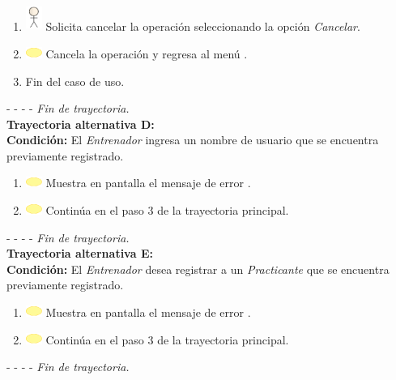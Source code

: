 \begin{enumerate}
	\item \includegraphics[width=15pt, height=25pt]{./Figuras/iconosCU/usuario.png} Solicita cancelar la operación seleccionando la opción \textit{Cancelar}.
	\item \includegraphics[width=15pt]{./Figuras/iconosCU/herramienta.png} Cancela la operación y regresa al menú .
	\item Fin del caso de uso.
\end{enumerate}

- - - - \textit{Fin de trayectoria.} \\



\textbf{\large{Trayectoria alternativa D:}}\\
\textbf{Condición: } El \textit{Entrenador} ingresa un nombre de usuario que se encuentra previamente registrado.

\begin{enumerate}
	\item \includegraphics[width=15pt]{./Figuras/iconosCU/herramienta.png} Muestra en pantalla el mensaje de error .
	\item \includegraphics[width=15pt]{./Figuras/iconosCU/herramienta.png} Continúa en el paso 3 de la trayectoria principal.
\end{enumerate}

- - - - \textit{Fin de trayectoria.} \\

\textbf{\large{Trayectoria alternativa E:}}\\
\textbf{Condición: } El \textit{Entrenador} desea registrar a un \textit{Practicante} que se encuentra previamente registrado.

\begin{enumerate}
	\item \includegraphics[width=15pt]{./Figuras/iconosCU/herramienta.png} Muestra en pantalla el mensaje de error .
	\item \includegraphics[width=15pt]{./Figuras/iconosCU/herramienta.png} Continúa en el paso 3 de la trayectoria principal.
\end{enumerate}

- - - - \textit{Fin de trayectoria.} \\
\clearpage